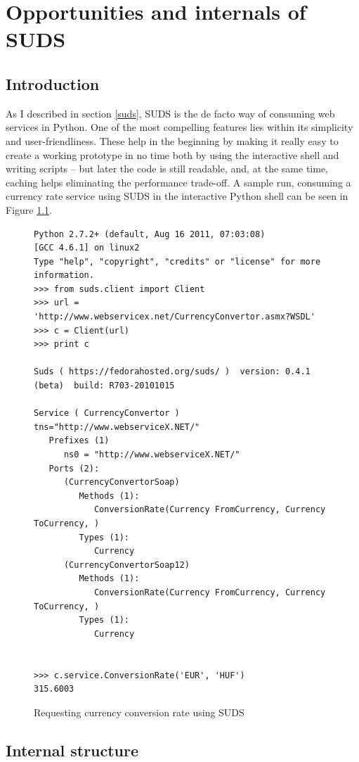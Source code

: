 \chapter{Opportunities and internals of SUDS}

\section{Introduction}

As I described in section \ref{suds}, SUDS is the de facto way of consuming web services in Python. One of the most compelling features lies within its simplicity and user-friendliness. These help in the beginning by making it really easy to create a working prototype in no time both by using the interactive shell and writing scripts -- but later the code is still readable, and, at the same time, caching helps eliminating the performance trade-off. A sample run, consuming a currency rate service using SUDS in the interactive Python shell can be seen in Figure \ref{fig:suds-currency}.

\begin{figure}[htbp]
 \centering
\begin{lstlisting}[numbers=off, basicstyle=\footnotesize\ttfamily]
Python 2.7.2+ (default, Aug 16 2011, 07:03:08)
[GCC 4.6.1] on linux2
Type "help", "copyright", "credits" or "license" for more information.
>>> from suds.client import Client
>>> url = 'http://www.webservicex.net/CurrencyConvertor.asmx?WSDL'
>>> c = Client(url)
>>> print c

Suds ( https://fedorahosted.org/suds/ )  version: 0.4.1 (beta)  build: R703-20101015

Service ( CurrencyConvertor ) tns="http://www.webserviceX.NET/"
   Prefixes (1)
      ns0 = "http://www.webserviceX.NET/"
   Ports (2):
      (CurrencyConvertorSoap)
         Methods (1):
            ConversionRate(Currency FromCurrency, Currency ToCurrency, )
         Types (1):
            Currency
      (CurrencyConvertorSoap12)
         Methods (1):
            ConversionRate(Currency FromCurrency, Currency ToCurrency, )
         Types (1):
            Currency


>>> c.service.ConversionRate('EUR', 'HUF')
315.6003
\end{lstlisting}
 \caption{Requesting currency conversion rate using SUDS}
 \label{fig:suds-currency}
\end{figure}

\section{Internal structure}


